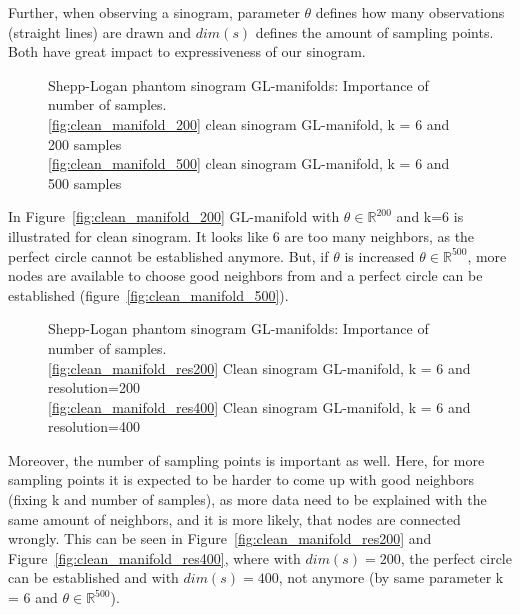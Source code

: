 Further, when observing a sinogram, parameter $\theta$ defines how many observations (straight lines) are drawn
and $dim(s)$ defines the amount of sampling points. Both have great impact to expressiveness of our sinogram.

\begin{figure}[H]
    \centering
    \hfill
    \hfill
    \hfill
    \caption{Shepp-Logan phantom sinogram GL-manifolds: Importance of number of samples. \\
    \ref{fig:clean_manifold_200} clean sinogram GL-manifold, k = 6 and 200 samples \\
    \ref{fig:clean_manifold_500} clean sinogram GL-manifold, k = 6 and 500 samples}
\end{figure}

In Figure~\ref{fig:clean_manifold_200} GL-manifold with $\theta \in \mathbb{R}^{200}$ and k=6 is illustrated
for clean sinogram. It looks like 6 are too many neighbors, as the perfect circle cannot be established anymore.
But, if $\theta$ is increased $\theta \in \mathbb{R}^{500}$, more nodes are available to choose good neighbors from
and a perfect circle can be established (figure~\ref{fig:clean_manifold_500}).

\begin{figure}[H]
    \centering
    \hfill
    \hfill
    \hfill
    \caption{Shepp-Logan phantom sinogram GL-manifolds: Importance of number of samples. \\
    \ref{fig:clean_manifold_res200} Clean sinogram GL-manifold, k = 6 and resolution=200 \\
    \ref{fig:clean_manifold_res400} Clean sinogram GL-manifold, k = 6 and resolution=400}
\end{figure}

Moreover, the number of sampling points is important as well.
Here, for more sampling points it is expected to be harder to come up with good neighbors (fixing k and number of samples),
as more data need to be explained with the same amount of neighbors, and it is more likely, that nodes are connected wrongly.
This can be seen in Figure~\ref{fig:clean_manifold_res200} and Figure~\ref{fig:clean_manifold_res400}, where with $dim(s) = 200$,
the perfect circle can be established and with $dim(s) = 400$, not anymore (by same parameter k = 6 and $\theta \in \mathbb{R}^{500}$).

